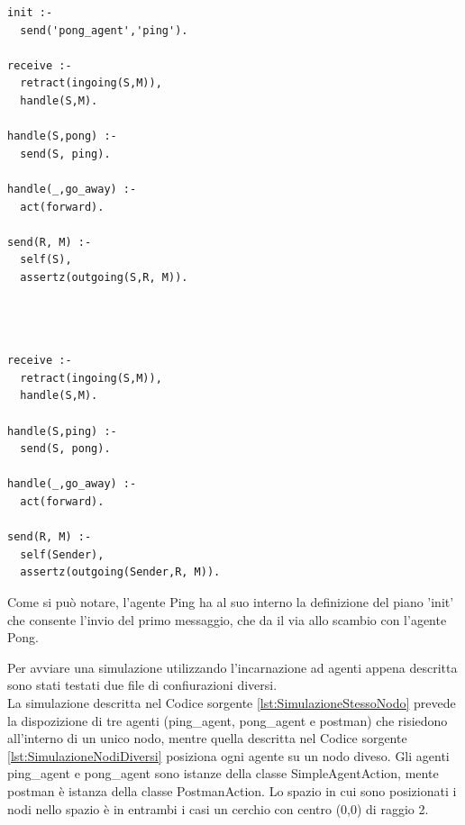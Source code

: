\documentclass[12pt,a4paper,openright,twoside]{report}
\begin{document}
\bigskip
\medskip
\begin{minipage}{0.45\textwidth}
\begin{lstlisting}[label={lst:PingAgent},caption={Ping agent}]
init :-
  send('pong_agent','ping').

receive :-
  retract(ingoing(S,M)),
  handle(S,M).

handle(S,pong) :-
  send(S, ping).

handle(_,go_away) :-
  act(forward).

send(R, M) :-
  self(S),
  assertz(outgoing(S,R, M)).
\end{lstlisting}
\end{minipage}
\hfill
\begin{minipage}{0.45\textwidth}
\begin{lstlisting}[label={lst:PongAgent},caption={Pong agent}]



receive :-
  retract(ingoing(S,M)),
  handle(S,M).

handle(S,ping) :-
  send(S, pong).

handle(_,go_away) :-
  act(forward).

send(R, M) :-
  self(Sender),
  assertz(outgoing(Sender,R, M)).
\end{lstlisting}
\end{minipage}%

\bigskip

Come si pu\`o notare, l'agente Ping ha al suo interno la definizione del piano 'init' che consente l'invio del primo messaggio, che da il via allo scambio con l'agente Pong.

Per avviare una simulazione utilizzando l'incarnazione ad agenti appena descritta sono stati testati due file di confiurazioni diversi.
\\
La simulazione descritta nel Codice sorgente \ref{lst:SimulazioneStessoNodo} prevede la dispozizione di tre agenti (ping\_agent, pong\_agent e postman) che risiedono all'interno di un unico nodo, mentre quella descritta nel Codice sorgente \ref{lst:SimulazioneNodiDiversi} posiziona ogni agente su un nodo diveso. Gli agenti ping\_agent e pong\_agent sono istanze della classe SimpleAgentAction, mente postman \`e istanza della classe PostmanAction. Lo spazio in cui sono posizionati i nodi nello spazio \`e in entrambi i casi un cerchio con centro (0,0) di raggio 2.
\end{document}
